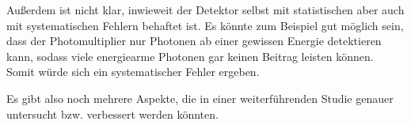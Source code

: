 Außerdem ist nicht klar, inwieweit der Detektor selbst mit statistischen aber auch
mit systematischen Fehlern behaftet ist. Es könnte zum Beispiel gut möglich sein, dass
der Photomultiplier nur Photonen ab einer gewissen Energie detektieren kann, sodass
viele energiearme Photonen gar keinen Beitrag leisten können. Somit würde sich ein
systematischer Fehler ergeben.

Es gibt also noch mehrere Aspekte, die in einer weiterführenden Studie genauer
untersucht bzw. verbessert werden könnten.